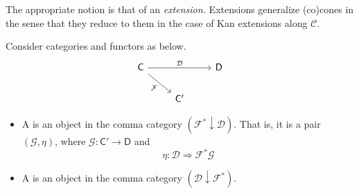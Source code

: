 \documentclass[main.tex]{subfiles}
\begin{document}
The appropriate notion is that of an \emph{extension.} Extensions generalize (co)cones in the sense that they reduce to them in the case of Kan extensions along $\mathcal{C}$.

\begin{definition}[extension]
  \label{def:extension}
  Consider categories and functors as below.
  \begin{equation*}
    \begin{tikzcd}
      \mathsf{C}
      \arrow[dr, swap, "\mathcal{F}"]
      \arrow[rr, "\mathcal{D}"]
      && \mathsf{D}
      \\
      & \mathsf{C'}
    \end{tikzcd}
  \end{equation*}
  \begin{itemize}
    \item A  is an object in the comma category $(\mathcal{F}^{*} \downarrow \mathcal{D})$. That is, it is a pair $(\mathcal{G}, \eta)$, where $\mathcal{G}\colon \mathsf{C}' \to \mathsf{D}$ and
      \begin{equation*}
        \eta\colon \mathcal{D} \Rightarrow \mathcal{F}^{*}\mathcal{G}
      \end{equation*}

    \item A  is an object in the comma category $(\mathcal{D} \downarrow \mathcal{F}^{*})$.
  \end{itemize}
\end{definition}
\end{document}

